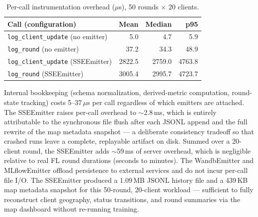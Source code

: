\begin{table}[t]
\caption{Per-call instrumentation overhead ($\mu$s), 50 rounds $\times$ 20 clients.}
\label{tab:overhead}
\centering
\begin{tabular}{lrrr}
\toprule
\textbf{Call (configuration)} & \textbf{Mean} & \textbf{Median} & \textbf{p95} \\
\midrule
\texttt{log\_client\_update} (no emitter) & 5.0 & 4.7 & 5.9 \\
\texttt{log\_round} (no emitter)           & 37.2 & 34.3 & 48.9 \\
\texttt{log\_client\_update} (SSEEmitter)  & 2822.5 & 2759.0 & 4763.8 \\
\texttt{log\_round} (SSEEmitter)           & 3005.4 & 2995.7 & 4723.7 \\
\bottomrule
\end{tabular}
\end{table}

Internal bookkeeping (schema normalization, derived-metric computation, round-state tracking) costs 5--37\,$\mu$s per call regardless of which emitters are attached. The SSEEmitter raises per-call overhead to $\sim$2.8\,ms, which is entirely attributable to the synchronous file flush after each JSONL append and the full rewrite of the map metadata snapshot — a deliberate consistency tradeoff so that crashed runs leave a complete, replayable artifact on disk. Summed over a 20-client round, the SSEEmitter adds $\sim$59\,ms of server overhead, which is negligible relative to real FL round durations (seconds to minutes). The WandbEmitter and MLflowEmitter offload persistence to external services and do not incur per-call file I/O. The SSEEmitter produced a 1.09\,MB JSONL history file and a 439\,KB map metadata snapshot for this 50-round, 20-client workload — sufficient to fully reconstruct client geography, status transitions, and round summaries via the map dashboard without re-running training.
